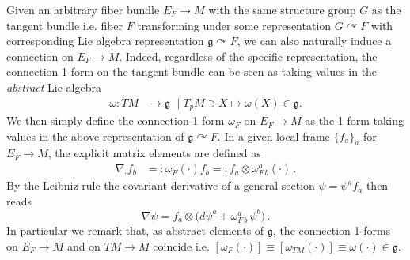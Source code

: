 \begin{mytheorem}
Given an arbitrary fiber bundle $E_F\to M$ with the same structure group $G$ as the tangent bundle i.e. fiber $F$ transforming under some representation $G\curvearrowright F$ with corresponding Lie algebra representation $\mathfrak{g}\curvearrowright F$, we can also naturally induce a connection on $E_F\to M$.
Indeed, regardless of the specific representation, the connection 1-form on the tangent bundle can be seen as taking values in the \emph{abstract} Lie algebra
\begin{align}
    \omega: TM &\to \mathfrak{g} \,\, \mid T_pM \ni X \mapsto \omega(X) \in \mathfrak{g}.
\end{align}
We then simply define the connection 1-form $\omega_{F}$ on $E_F\to M$ as the 1-form taking values in the above representation of $\mathfrak{g}\curvearrowright F$.
In a given local frame $\{f_a\}_a$ for $E_F\to M$, the explicit matrix elements are defined as
\begin{align}
    \nabla_\cdot f_b &=: \omega_{F}(\cdot) f_b =: f_a \otimes \omega^a_{F\, b}(\cdot)\,.
\end{align}
By the Leibniz rule the covariant derivative of a general section $\psi = \psi^a f_a$ then reads
\begin{equation}
    \nabla \psi = f_a \otimes \big(d\psi^a + \omega_{F\, b}^a \, \psi^b\big)\,.
\end{equation}
In particular we remark that, as abstract elements of $\mathfrak{g}$, the connection 1-forms on $E_F\to M$ and on $TM\to M$ coincide i.e. $[\omega_{F}(\cdot)]\equiv [ \omega_{TM}(\cdot)] \equiv \omega(\cdot)\in \mathfrak{g}$.
\end{mytheorem}


